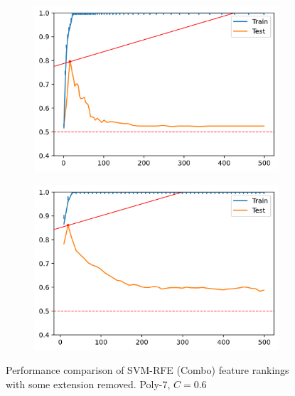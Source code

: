 \begin{figure}[H]
    \centering
    \begin{subfigure}[b]{0.4\linewidth}
        \includegraphics[width=\linewidth]{img/ch5/combo/twice-2.png}
    \end{subfigure}
    \begin{subfigure}[b]{0.4\linewidth}
        \includegraphics[width=\linewidth]{img/ch5/combo/twice-3.png}
    \end{subfigure}
    \caption{Performance comparison of SVM-RFE (Combo) feature rankings with some extension removed. Poly-7, $C=0.6$}
    \label{fig:ch5.combo.art.comp2}
\end{figure}

